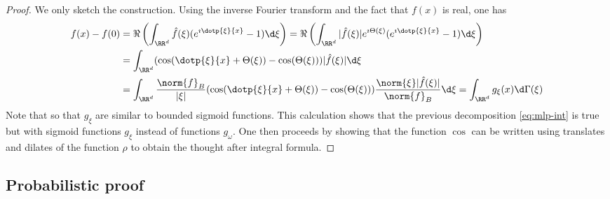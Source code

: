 \begin{proof}
We only sketch the construction. Using the inverse Fourier transform and the fact that $f(x)$ is real, one has 
\begin{align*}
	f(x) - f(0) &= \Re \left (\int_{\RR^d}\hat{f}(\xi) (e^{\imath \dotp{\xi}{x}}- 1) \d\xi \right) 
	= \Re \left (\int_{\RR^d}| \hat{f}( \xi) | e^{\imath \Theta (\xi)}(e^{\imath \dotp{\xi}{x}}- 1) \d\xi \right) \\
	&= \int_{\RR^d}(\cos ( \dotp{\xi}{x} + \Theta (\xi)) - \cos (\Theta (\xi))) | \hat{f}(\xi) | \d\xi  \\
	& = \int_{\RR^d}\frac{\norm{f}_B}{| \xi |}(\cos (\dotp{\xi}{x} + \Theta (\xi) ) - \cos (\Theta (\xi))) 
	\frac{\norm{\xi} | \hat{f}(\xi) |}{\norm{f}_B}\d\xi = \int_{\RR^d}g_\xi(x) \d\Gamma (\xi) 
\end{align*}
%
Note that 
so that $g_\xi$ are similar to bounded sigmoid functions.
%
This calculation shows that the previous decomposition \eqref{eq:mlp-int} is true but with sigmoid functions $g_\xi$  instead of functions $g_\omega$. One then proceeds by showing that the function $\cos$ can be written using translates and dilates of the function $\rho$ to obtain the thought after integral formula.
\end{proof}


\subsection{Probabilistic proof}

